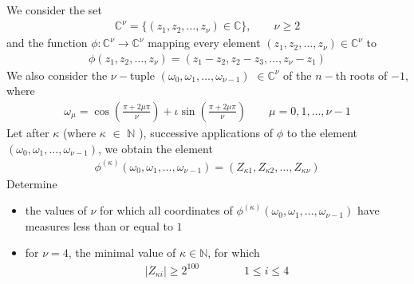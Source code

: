 We consider the set
\begin{align*} \mathbb{C}^{\nu} = \{ (z_1,z_2, \ldots , z_{\nu}) \in \mathbb{C} \},\qquad  \nu \geq 2 \end{align*}and the function $\phi : \mathbb{C}^{\nu} \longrightarrow \mathbb{C}^{\nu}$ mapping every element $(z_1,z_2, \ldots , z_{\nu}) \in \mathbb{C}^{\nu}$ to
\begin{align*}\phi ( z_1,z_2, \ldots , z_{\nu})= \left( z_1-z_2, z_2-z_3, \ldots, z_{\nu}-z_1 \right) \end{align*}We also consider the $\nu-$tuple $(\omega_0, \omega_1, \ldots , \omega_{\nu-1} )$ $\in \mathbb{C}^{\nu}$ of the $n-$th roots of $-1$, where
\begin{align*} \omega_{\mu} = \cos \left( \frac{\pi + 2\mu \pi }{\nu} \right) + \iota \sin \left( \frac{\pi + 2\mu \pi}{\nu} \right) \qquad \mu =0,1, \ldots , \nu -1 \end{align*}Let after $\kappa$ (where $\kappa$ $\in$ $\mathbb{N}$ ), successive applications of $\phi$ to the element $(\omega_0, \omega_1, \ldots , \omega_{\nu-1} )$, we obtain the element
\begin{align*} \phi ^{(\kappa)} \left( \omega_0, \omega_1, \ldots , \omega_{\nu-1} \right) =\left( Z_{\kappa 1}, Z_{\kappa 2}, \ldots , Z_{\kappa \nu } \right) \end{align*}Determine
\begin{itemize}
	\item the values of $\nu$ for which all coordinates of $\phi ^{(\kappa)} \left( \omega_0, \omega_1, \ldots , \omega_{\nu-1} \right) $ have measures less than or equal to $1$
	\item for $\nu =4$, the minimal value of $\kappa \in \mathbb{N}$, for which
\begin{align*} \mid Z_{\kappa i} \mid \geq 2^{100} \qquad \qquad 1 \le i \le 4 \end{align*}
\end{itemize}
